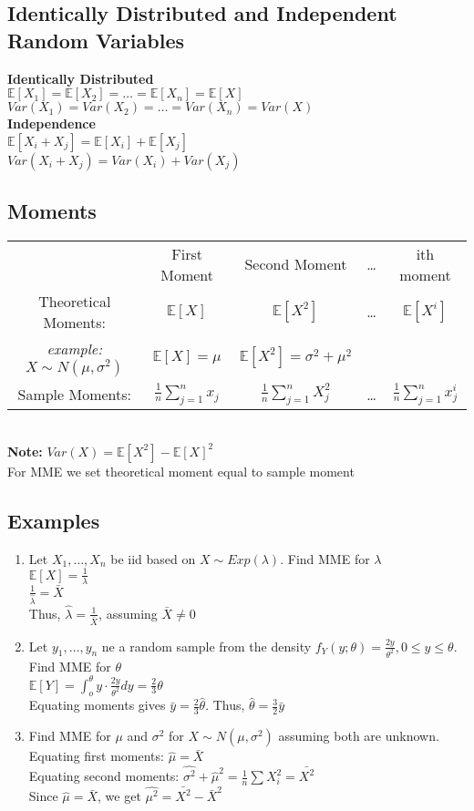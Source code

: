 \documentclass{article}
\begin{document}
\subsection{Identically Distributed and Independent Random Variables}
\textbf{Identically Distributed}\\
$\mathbb{E}[X_1]=\mathbb{E}[X_2]=\dots=\mathbb{E}[X_n]=\mathbb{E}[X]$\\
$Var(X_1)=Var(X_2)=\dots=Var(X_n)=Var(X)$\\
\textbf{Independence}\\
$\mathbb{E}[X_i+X_j]=\mathbb{E}[X_i]+\mathbb{E}[X_j]$\\
$Var(X_i+X_j)=Var(X_i)+Var(X_j)$
\subsection{Moments}
\begin{tabular}{c c c c c}
    & First Moment & Second Moment & \dots & ith moment\\
    Theoretical Moments: & $\mathbb{E}[X]$ & $\mathbb{E}[X^2]$ & \dots & $\mathbb{E}[X^i]$\\
    \textit{example: } $X\sim N(\mu,\sigma^2)$ & $\mathbb{E}[X]=\mu$ & $\mathbb{E}[X^2]=\sigma^2+\mu^2$ & &\\
    Sample Moments: & $\frac{1}{n}\sum_{j=1}^nx_j$&$\frac{1}{n}\sum_{j=1}^nX_j^2$&\dots&$\frac{1}{n}\sum_{j=1}^nx_j^i$
\end{tabular}\\
\newline
\newline
\textbf{Note: } $Var(X)=\mathbb{E}[X^2]-\mathbb{E}[X]^2$\\
For MME we set theoretical moment equal to sample moment
\subsection{Examples}
\begin{enumerate}
    \item Let $X_1,\dots,X_n$ be iid based on $X\sim Exp(\lambda)$. Find MME for $\lambda$\\
    $\mathbb{E}[X]=\frac{1}{\lambda}$\\
    $\frac{1}{\hat\lambda}=\bar X$\\
    Thus, $\hat\lambda = \frac{1}{\bar X}$, assuming $\bar X\neq0$
    \item Let $y_1,\dots,y_n$ ne a random sample from the density $f_Y(y;\theta)=\frac{2y}{\theta^2},0\leq y\leq\theta$. Find MME for $\theta$\\
    $\mathbb{E}[Y]=\int_o^\theta y\cdot\frac{2y}{\theta^2}dy=\frac{2}{3}\theta$\\
    Equating moments gives $\bar y=\frac{2}{3}\hat\theta$. Thus, $\hat\theta=\frac{3}{2}\bar y$
    \item Find MME for $\mu$ and $\sigma^2$ for $X\sim N(\mu,\sigma^2)$ assuming both are unknown.\\
    Equating first moments: $\hat\mu=\bar X$\\
    Equating second moments: $\hat{\sigma^2}+\hat\mu^2=\frac{1}{n}\sum X_i^2=\bar{X^2}$\\
    Since $\hat\mu=\bar X$, we get $\hat{\mu^2}=\bar{X^2}-\bar X^2$
\end{enumerate}
\end{document}
